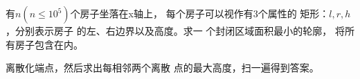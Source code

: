 \begin{prob}
	有$n(n \le 10^5)$个房子坐落在x轴上，
	每个房子可以视作有3个属性的
	矩形：$l,r,h$，分别表示房子
	的左、右边界以及高度。求一
	个封闭区域面积最小的轮廓，
	将所有房子包含在内。
\end{prob}

\begin{sol}
	离散化端点，然后求出每相邻两个离散
	点的最大高度，扫一遍得到答案。
\end{sol}
